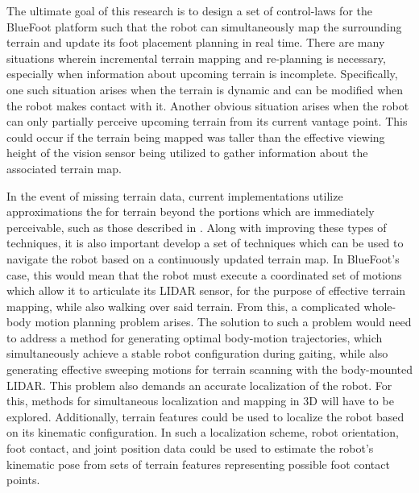 	The ultimate goal of this research is to design a set of control-laws for the BlueFoot platform such that the robot can simultaneously map the surrounding terrain and update its foot placement planning in real time. There are many situations wherein incremental terrain mapping and re-planning is necessary, especially when information about upcoming terrain is incomplete. Specifically, one such situation arises when the terrain is dynamic and can be modified when the robot makes contact with it. Another obvious situation arises when the robot can only partially perceive upcoming terrain from its current vantage point. This could occur if the terrain being mapped was taller than the effective viewing height of the vision sensor being utilized to gather information about the associated terrain map.

	In the event of missing terrain data, current implementations utilize approximations the for terrain beyond the portions which are immediately perceivable, such as those described in \cite{Kolter2009}. Along with improving these types of techniques, it is also important develop a set of techniques which can be used to navigate the robot based on a continuously updated terrain map. In BlueFoot's case, this would mean that the robot must execute a coordinated set of motions which allow it to articulate its LIDAR sensor, for the purpose of effective terrain mapping, while also walking over said terrain. From this, a complicated whole-body motion planning problem arises. The solution to such a problem would need to address a method for generating optimal body-motion trajectories, which simultaneously achieve a stable robot configuration during gaiting, while also generating effective sweeping motions for terrain scanning with the body-mounted LIDAR. This problem also demands an accurate localization of the robot. For this, methods for simultaneous localization and mapping in 3D will have to be explored. Additionally, terrain features could be used to localize the robot based on its kinematic configuration. In such a localization scheme, robot orientation, foot contact, and joint position data could be used to estimate the robot's kinematic pose from sets of terrain features representing possible foot contact points.

